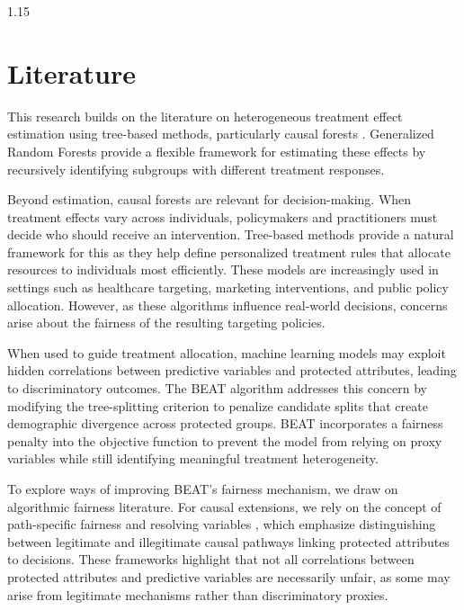\documentclass[11pt, a4paper]{article}
\begin{document}
\begin{spacing}{1.15}
\section*{Literature}
This research builds on the literature on heterogeneous treatment effect estimation using tree-based methods, particularly causal forests \citep{athey2019generalized}. Generalized Random Forests provide a flexible framework for estimating these effects by recursively identifying subgroups with different treatment responses. 

Beyond estimation, causal forests are relevant for decision-making. When treatment effects vary across individuals, policymakers and practitioners must decide who should receive an intervention. Tree-based methods provide a natural framework for this as they help define personalized treatment rules that allocate resources to individuals most efficiently. These models are increasingly used in settings such as healthcare targeting, marketing interventions, and public policy allocation. However, as these algorithms influence real-world decisions, concerns arise about the fairness of the resulting targeting policies.

When used to guide treatment allocation, machine learning models may exploit hidden correlations between predictive variables and protected attributes, leading to discriminatory outcomes. The BEAT algorithm \citep{ascarza2022eliminating} addresses this concern by modifying the tree-splitting criterion to penalize candidate splits that create demographic divergence across protected groups. BEAT incorporates a fairness penalty into the objective function to prevent the model from relying on proxy variables while still identifying meaningful treatment heterogeneity.


To explore ways of improving BEAT’s fairness mechanism, we draw on algorithmic fairness literature. For causal extensions, we rely on the concept of path-specific fairness and resolving variables \citep{kilbertus2017avoiding, chiappa2019path}, which emphasize distinguishing between legitimate and illegitimate causal pathways linking protected attributes to decisions. These frameworks highlight that not all correlations between protected attributes and predictive variables are necessarily unfair, as some may arise from legitimate mechanisms rather than discriminatory proxies. 


\end{spacing}
\end{document}
